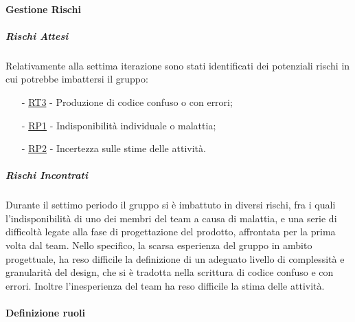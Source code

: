 \documentclass[10pt]{article}
\begin{document}
{{{{{{{{        \paragraph{Gestione Rischi}\mbox{}
        \vspace{-1em}
        \subparagraph*{Rischi Attesi}\mbox{}
        
        Relativamente alla settima iterazione sono stati identificati dei potenziali rischi in cui potrebbe imbattersi il gruppo:
        \vspace{-0.5em}
        \begin{itemize}
        \setlength\itemsep{-0.2em}
        \item [-] \hyperref[RT3]{RT3} - Produzione di codice confuso o con errori;
        \item [-] \hyperref[RP1]{RP1} - Indisponibilità individuale o malattia;
        \item [-] \hyperref[RP2]{RP2} - Incertezza sulle stime delle attività.
        \end{itemize}

        \subparagraph*{Rischi Incontrati}\mbox{}
        
        Durante il settimo periodo il gruppo si è imbattuto in diversi rischi, fra i quali l'indisponibilità di uno dei membri del team a causa di malattia, e una serie
        di difficoltà legate alla fase di progettazione del prodotto, affrontata per la prima volta dal team. Nello specifico, la scarsa esperienza del gruppo in ambito 
        progettuale, ha reso difficile la definizione di un adeguato livello di complessità e granularità del design, che si è tradotta nella scrittura di codice confuso
        e con errori. Inoltre l'inesperienza del team ha reso difficile la stima delle attività.       

        \paragraph{Definizione ruoli}\mbox{}\vspace{0.4em}
        
}}}}}}}}
\end{document}
